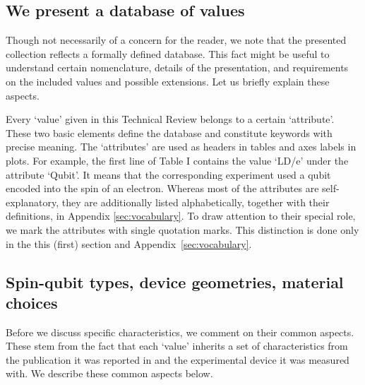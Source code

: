 \documentclass[aps, prx, showpacs, twocolumn, superscriptaddress, notitlepage, longbibliography, floatfix, nofootinbib]{revtex4-2}
\newcommand{\myKey}[1]{$\whitearrowupfrombar$\textit{#1}}
\renewcommand{\myKey}[1]{\textit{#1}}
\renewcommand{\myKey}[1]{`{#1}'}
\newcommand{\recheck}[1]{{#1}}
\begin{document}
\subsection{We present a database of values}

Though not necessarily of a concern for the reader, we note that the presented collection reflects a formally defined database. This fact might be useful to understand certain nomenclature, details of the presentation, and requirements on the included values and possible extensions. Let us briefly explain these aspects.

Every \myKey{value} given in this Technical Review belongs to a certain \myKey{attribute}. These two basic elements define the database and constitute keywords with precise meaning. The \myKey{attributes} are used as headers in tables and axes labels in plots. \recheck{For example, the first line of Table I contains the value \myKey{LD/e} under the attribute \myKey{Qubit}.} It means that the corresponding experiment used a qubit encoded into the spin of an electron. Whereas most of the attributes are self-explanatory, they are additionally listed alphabetically, together with their definitions, in Appendix \ref{sec:vocabulary}. To draw attention to their special role, we mark the attributes with single quotation marks.
This distinction is done only in the this (first) section and Appendix~\ref{sec:vocabulary}.

\subsection{Spin-qubit types, device geometries, material choices}

Before we discuss specific characteristics, we comment on their common aspects. These stem from the fact that each \myKey{value} inherits a set of characteristics from the publication it was reported in and the experimental device it was measured with. We describe these common aspects below.
\end{document}
